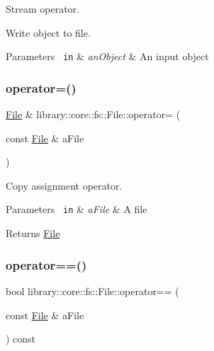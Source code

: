 Stream operator. 

\begin{DoxyVerb}                Write object to file.
\end{DoxyVerb}



\begin{DoxyParams}[1]{Parameters}
\mbox{\texttt{ in}}  & {\em an\+Object} & An input object \\
\hline
\end{DoxyParams}
\mbox{\label{classlibrary_1_1core_1_1fs_1_1_file_a8143d55e67cf2d6256c7653619a03909}} 
\subsubsection{\texorpdfstring{operator=()}{operator=()}}
{\footnotesize\ttfamily \mbox{\hyperlink{classlibrary_1_1core_1_1fs_1_1_file}{File}} \& library\+::core\+::fs\+::\+File\+::operator= (\begin{DoxyParamCaption}\item[{const \mbox{\hyperlink{classlibrary_1_1core_1_1fs_1_1_file}{File}} \&}]{a\+File }\end{DoxyParamCaption})}



Copy assignment operator. 


\begin{DoxyParams}[1]{Parameters}
\mbox{\texttt{ in}}  & {\em a\+File} & A file \\
\hline
\end{DoxyParams}
\begin{DoxyReturn}{Returns}
\mbox{\hyperlink{classlibrary_1_1core_1_1fs_1_1_file}{File}} 
\end{DoxyReturn}
\mbox{\label{classlibrary_1_1core_1_1fs_1_1_file_a44ab79a23c5a129be298a026dbeec62f}} 
\subsubsection{\texorpdfstring{operator==()}{operator==()}}
{\footnotesize\ttfamily bool library\+::core\+::fs\+::\+File\+::operator== (\begin{DoxyParamCaption}\item[{const \mbox{\hyperlink{classlibrary_1_1core_1_1fs_1_1_file}{File}} \&}]{a\+File }\end{DoxyParamCaption}) const}



